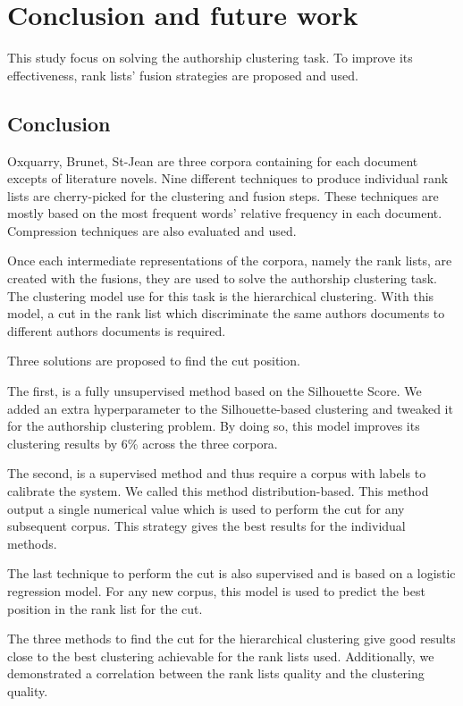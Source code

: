 \chapter{Conclusion and future work\label{sec:conclusion}}

This study focus on solving the authorship clustering task.
To improve its effectiveness, rank lists' fusion strategies are proposed and used.

\section{Conclusion}

Oxquarry, Brunet, St-Jean are three corpora containing for each document excepts of literature novels.
Nine different techniques to produce individual rank lists are cherry-picked for the clustering and fusion steps.
These techniques are mostly based on the most frequent words' relative frequency in each document.
Compression techniques are also evaluated and used.

Once each intermediate representations of the corpora, namely the rank lists, are created with the fusions, they are used to solve the authorship clustering task.
The clustering model use for this task is the hierarchical clustering.
With this model, a cut in the rank list which discriminate the same authors documents to different authors documents is required.

Three solutions are proposed to find the cut position.

The first, is a fully unsupervised method based on the Silhouette Score.
We added an extra hyperparameter to the Silhouette-based clustering and tweaked it for the authorship clustering problem.
By doing so, this model improves its clustering results by 6\% across the three corpora.

The second, is a supervised method and thus require a corpus with labels to calibrate the system.
We called this method distribution-based.
This method output a single numerical value which is used to perform the cut for any subsequent corpus.
This strategy gives the best results for the individual methods.

The last technique to perform the cut is also supervised and is based on a logistic regression model.
For any new corpus, this model is used to predict the best position in the rank list for the cut.

The three methods to find the cut for the hierarchical clustering give good results close to the best clustering achievable for the rank lists used.
Additionally, we demonstrated a correlation between the rank lists quality and the clustering quality.

